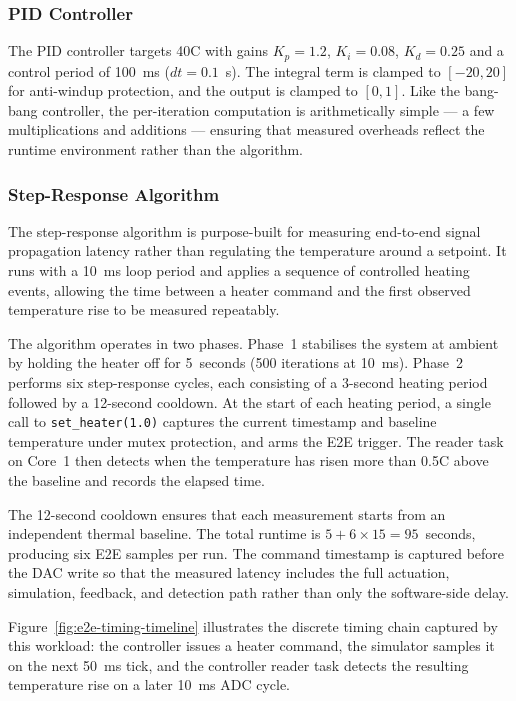 \documentclass[12pt, a4paper]{report}
\begin{document}
\subsubsection{PID Controller}
\label{subsec:pid-impl}

The PID controller targets 40\textdegree C with gains $K_p = 1.2$, $K_i = 0.08$, $K_d = 0.25$ and a control period of 100~ms ($dt = 0.1$~s). The integral term is clamped to $[-20, 20]$ for anti-windup protection, and the output is clamped to $[0, 1]$. Like the bang-bang controller, the per-iteration computation is arithmetically simple --- a few multiplications and additions --- ensuring that measured overheads reflect the runtime environment rather than the algorithm.

\subsubsection{Step-Response Algorithm}
\label{subsec:step-response}

The step-response algorithm is purpose-built for measuring end-to-end signal propagation latency rather than regulating the temperature around a setpoint. It runs with a 10~ms loop period and applies a sequence of controlled heating events, allowing the time between a heater command and the first observed temperature rise to be measured repeatably.

The algorithm operates in two phases. Phase~1 stabilises the system at ambient by holding the heater off for 5~seconds (500 iterations at 10~ms). Phase~2 performs six step-response cycles, each consisting of a 3-second heating period followed by a 12-second cooldown. At the start of each heating period, a single call to \texttt{set\_heater(1.0)} captures the current timestamp and baseline temperature under mutex protection, and arms the E2E trigger. The reader task on Core~1 then detects when the temperature has risen more than 0.5\textdegree C above the baseline and records the elapsed time.

The 12-second cooldown ensures that each measurement starts from an independent thermal baseline. The total runtime is $5 + 6 \times 15 = 95$~seconds, producing six E2E samples per run. The command timestamp is captured before the DAC write so that the measured latency includes the full actuation, simulation, feedback, and detection path rather than only the software-side delay.

Figure~\ref{fig:e2e-timing-timeline} illustrates the discrete timing chain captured by this workload: the controller issues a heater command, the simulator samples it on the next 50~ms tick, and the controller reader task detects the resulting temperature rise on a later 10~ms ADC cycle.
\end{document}
